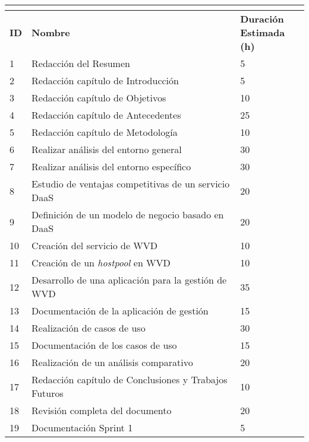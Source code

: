 \begin{tabular}{|l|l|l|}
	\hline
	\multicolumn{3}{|c|}{\cellcolor[HTML]{343434}{\color[HTML]{FFFFFF} \textbf{Pila de Producto}}} \\ \hline
	\textbf{ID} & \textbf{Nombre} & \specialcell{\textbf{Duración} \\ \textbf{Estimada (h)}} \\ \hline
	1  & Redacción del Resumen                                      & 5  \\ \hline
	2  & Redacción capítulo de Introducción                         & 5  \\ \hline
	3  & Redacción capítulo de Objetivos                            & 10 \\ \hline
	4  & Redacción capítulo de Antecedentes                         & 25 \\ \hline
	5  & Redacción capítulo de Metodología                          & 10 \\ \hline
	6  & Realizar análisis del entorno general                      & 30 \\ \hline
	7  & Realizar análisis del entorno específico                   & 30 \\ \hline
	8  & Estudio de ventajas competitivas de un servicio \acs{DaaS} & 20 \\ \hline
	9  & Definición de un modelo de negocio basado en \acs{DaaS}    & 20 \\ \hline
	10 & Creación del servicio de \acs{WVD}                         & 10 \\ \hline
	11 & Creación de un \textit{hostpool} en \acs{WVD}              & 10 \\ \hline
	12 & Desarrollo de una aplicación para la gestión de \acs{WVD}  & 35 \\ \hline
	13 & Documentación de la aplicación de gestión                  & 15 \\ \hline
	14 & Realización de casos de uso                                & 30 \\ \hline
	15 & Documentación de los casos de uso                          & 15 \\ \hline
	16 & Realización de un análisis comparativo                     & 20 \\ \hline
	17 & Redacción capítulo de Conclusiones y Trabajos Futuros      & 10 \\ \hline
	18 & Revisión completa del documento                            & 20 \\ \hline
	19 & Documentación Sprint 1                                     & 5  \\ \hline

\end{tabular}
